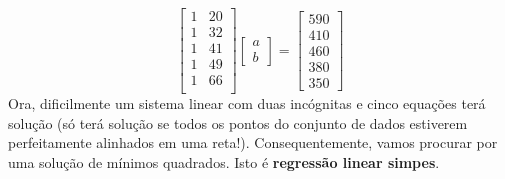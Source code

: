 \begin{ex}
\begin{equation}
  \begin{bmatrix}
    1 & 20 \\
    1 & 32 \\
    1 & 41 \\
    1 & 49 \\
    1 & 66 \\
  \end{bmatrix}
  \begin{bmatrix}
    a \\ b
  \end{bmatrix} =
  \begin{bmatrix}
    590 \\ 410 \\ 460 \\ 380 \\ 350
  \end{bmatrix}
  \end{equation} Ora, dificilmente um sistema linear com duas incógnitas e cinco equações terá solução (só terá solução se todos os pontos do conjunto de dados estiverem perfeitamente alinhados em uma reta!). Consequentemente, vamos procurar por uma solução de mínimos quadrados. Isto é \textbf{regressão linear simpes}.


\end{ex}
